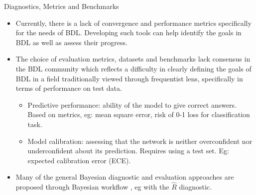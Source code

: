\documentclass[9pt,handout]{beamer}
\begin{document}
\begin{frame}{Diagnostics, Metrics and Benchmarks}
\begin{itemize}[<+->]
	\item Currently, there is a lack of \alert{convergence} and \alert{performance metrics} specifically for the needs of BDL. Developing such tools can help identify the goals in BDL as well as assess their progress. %
	\item The choice of \alert{evaluation metrics}, \alert{datasets} and \alert{benchmarks} lack consensus in the BDL community which reflects a difficulty in clearly defining the goals of BDL in a field traditionally viewed through frequentist lens, specifically in terms of performance on test data. %
	\begin{itemize}[<+->]
	\item \alert{Predictive performance}: ability of the model to give correct answers. Based on metrics, eg: mean square error, risk of 0-1 loss for classification task.
	\item \alert{Model calibration}: assessing that the network is neither overconfident nor underconfident about its prediction. Requires using a test set. Eg: expected calibration error (ECE).
	\end{itemize}
	\item Many of the general Bayesian diagnostic and evaluation approaches are proposed through Bayesian workflow \citep{gelman2020bayesian}, eg with the $\hat R$ diagnostic. 
%

\end{itemize}
\end{frame}
\end{document}

